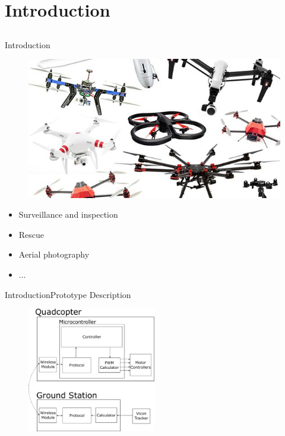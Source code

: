 \section{Introduction}

\subsection{}
\begin{frame}{Introduction}{}
    \begin{figure}[H]
        \centering
        \includegraphics[width=.6\linewidth]{figures/multicopters}
    \end{figure}
    \begin{itemize}
         \item Surveillance and inspection
         \item Rescue
         \item Aerial photography
         \item ...
    \end{itemize}

\end{frame}

\begin{frame}{Introduction}{Prototype Description}
     \begin{figure}
         \centering
         \includegraphics[width=0.5\textwidth]{figures/prototypediagram}
        \end{figure}
\end{frame}

